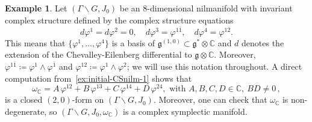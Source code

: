 \documentclass[a4paper]{amsart}
\theoremstyle{definition}
\newtheorem{example}[theorem]{Example}
\theoremstyle{remark}
\newcommand{\bC}{{\mathbb C}}
\numberwithin{equation}{section}
\begin{document}
\begin{example}\label{ex:deformation-1-NLA}
Let $(\Gamma\backslash G,J_0)$ be an $8$-dimensional nilmanifold with invariant complex structure defined by the complex structure equations
\begin{equation}\label{ex:initial-CSnilm-1}
 d\varphi^1=d\varphi^2=0, \quad d\varphi^3=\varphi^{1\bar1}, \quad d\varphi^4=\varphi^{12}.
\end{equation}
This means that $\{\varphi^1,\ldots,\varphi^4\}$ is a basis of $\mathfrak{g}^{(1,0)}\subset\mathfrak{g}^*\otimes\bC$ and $d$ denotes the extension of the Chevalley-Eilenberg differential to $\mathfrak{g}\otimes\bC$. Moreover, $\varphi^{1\bar 1}\coloneqq\varphi^1\wedge \varphi^{\bar1}$ and $\varphi^{12}\coloneqq\varphi^1\wedge\varphi^2$; we will use this notation throughout. A direct computation from~\eqref{ex:initial-CSnilm-1} shows that
\[
\omega_{\mathbb C}=A\,\varphi^{12}+B\,\varphi^{13}+C\,\varphi^{14}+D\,\varphi^{24}, \text{ with }A,B,C,D\in\mathbb C, \ BD\neq 0\,,
\]
is a closed $(2,0)$-form on $(\Gamma\backslash G,J_0)$. Moreover, one can check that $\omega_{\mathbb C}$ is non-degenerate, so $(\Gamma\backslash G,J_0,\omega_{\mathbb C})$ is a complex symplectic manifold.


\end{example}
\end{document}
